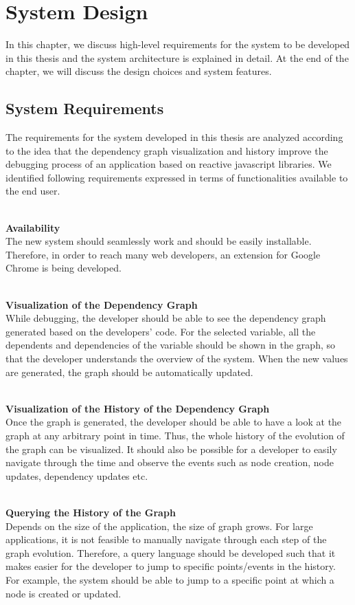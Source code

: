 \chapter{System Design} \label{chap:System Design}
In this chapter, we discuss high-level requirements for the system to be developed in this thesis and the system architecture is explained in detail. 
At the end of the chapter, we will discuss the design choices and system features.

\section{System Requirements}
The requirements for the system developed in this thesis are analyzed according to the idea that the dependency graph visualization and history improve the debugging process of an application based on reactive javascript libraries. We identified following requirements expressed in terms of functionalities available to the end user.

\leavevmode
\\
\textbf{Availability}
\\
The new system should seamlessly work and should be easily installable. Therefore, in order to reach many web developers, an extension for Google Chrome is being developed. 

\leavevmode
\\
\textbf{Visualization of the Dependency Graph}
\\
While debugging, the developer should be able to see the dependency graph generated based on the developers' code. For the selected variable, all the dependents and dependencies of the variable should be shown in the graph, so that the developer understands the overview of the system. 
When the new values are generated, the graph should be automatically updated.

\leavevmode
\\
\textbf{Visualization of the History of the Dependency Graph}
\\
Once the graph is generated, the developer should be able to have a look at the graph at any arbitrary point in time. Thus, the whole history of the evolution of the graph can be visualized. It should also be possible for a developer to easily navigate through the time and observe the events such as node creation, node updates, dependency updates etc.

\leavevmode
\\
\textbf{Querying the History of the Graph}
\\
Depends on the size of the application, the size of graph grows. For large applications, it is not feasible to manually navigate through each step of the graph evolution. Therefore, a query language should be developed such that it makes easier for the developer to jump to specific points/events in the history. For example, the system should be able to jump to a specific point at which a node is created or updated.


